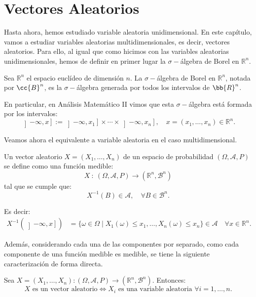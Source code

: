 \chapter{Vectores Aleatorios}

Hasta ahora, hemos estudiado variable aleatoria unidimensional.
En este capítulo, vamos a estudiar variables aleatorias multidimensionales, es decir, vectores aleatorios.
Para ello, al igual que como hicimos con las variables aleatorias unidimensionales, hemos de definir en primer lugar la $\sigma-$álgebra de Borel en $\mathbb{R}^n$.
\begin{definicion}
    Sea $\mathbb{R}^n$ el espacio euclídeo de dimensión $n$.
    La $\sigma-$álgebra de Borel en $\mathbb{R}^n$, notada por $\cc{B}^n$, es la $\sigma-$álgebra generada por todos los intervalos de $\bb{R}^n$.
\end{definicion}

En particular, en Análisis Matemático II vimos que esta $\sigma-$álgebra está formada por los intervalos:
\begin{equation*}
    \left]-\infty, x\right] := \left]-\infty, x_1\right] \times \cdots \times \left]-\infty, x_n\right], \quad x = (x_1, \ldots, x_n) \in \mathbb{R}^n.
\end{equation*}

Veamos ahora el equivalente a variable aleatoria en el caso multidimensional.
\begin{definicion}
    Un vector aleatorio $X=(X_1, \ldots, X_n)$ de un espacio de probabilidad $(\Omega, \mathcal{A}, P)$ se define como una función medible:
    \begin{equation*}
        X~:~(\Omega, \mathcal{A}, P) \to (\mathbb{R}^n, \mathcal{B}^n)
    \end{equation*}
    tal que se cumple que:
    \begin{equation*}
        X^{-1}(B)\in \mathcal{A}, \quad \forall B\in \mathcal{B}^n.
    \end{equation*}
\end{definicion}

Es decir:
\begin{align*}
    X^{-1}(\left]-\infty, x\right]) &= \{\omega\in \Omega \mid X_1(\omega)\leq x_1, \ldots, X_n(\omega)\leq x_n\} \in \mathcal{A}
    \quad \forall x\in \mathbb{R}^n.
\end{align*}

Además, considerando cada una de las componentes por separado, como cada componente de una función medible es medible, se tiene la siguiente caracterización de forma directa.
\begin{teo}
    Sea $X=(X_1, \ldots, X_n): (\Omega, \mathcal{A}, P) \to (\mathbb{R}^n, \mathcal{B}^n)$. Entonces:
    \begin{equation*}
        X \text{ es un vector aleatorio} \iff X_i \text{ es una variable aleatoria } \forall i=1, \ldots, n.
    \end{equation*}
\end{teo}

